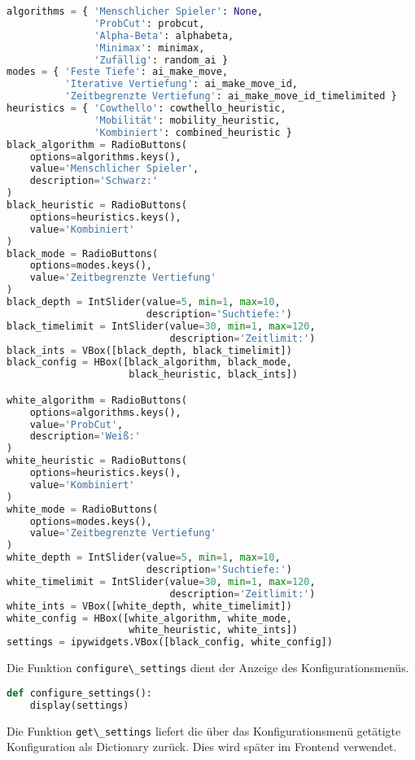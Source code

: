 \begin{lstlisting}[language=Python]
algorithms = { 'Menschlicher Spieler': None,
               'ProbCut': probcut,
               'Alpha-Beta': alphabeta,
               'Minimax': minimax,
               'Zufällig': random_ai }
modes = { 'Feste Tiefe': ai_make_move,
          'Iterative Vertiefung': ai_make_move_id,
          'Zeitbegrenzte Vertiefung': ai_make_move_id_timelimited }
heuristics = { 'Cowthello': cowthello_heuristic,
               'Mobilität': mobility_heuristic,
               'Kombiniert': combined_heuristic }
black_algorithm = RadioButtons(
    options=algorithms.keys(),
    value='Menschlicher Spieler',
    description='Schwarz:'
)
black_heuristic = RadioButtons(
    options=heuristics.keys(),
    value='Kombiniert'
)
black_mode = RadioButtons(
    options=modes.keys(),
    value='Zeitbegrenzte Vertiefung'
)
black_depth = IntSlider(value=5, min=1, max=10,
                        description='Suchtiefe:')
black_timelimit = IntSlider(value=30, min=1, max=120,
                            description='Zeitlimit:')
black_ints = VBox([black_depth, black_timelimit])
black_config = HBox([black_algorithm, black_mode,
                     black_heuristic, black_ints])

white_algorithm = RadioButtons(
    options=algorithms.keys(),
    value='ProbCut',
    description='Weiß:'
)
white_heuristic = RadioButtons(
    options=heuristics.keys(),
    value='Kombiniert'
)
white_mode = RadioButtons(
    options=modes.keys(),
    value='Zeitbegrenzte Vertiefung'
)
white_depth = IntSlider(value=5, min=1, max=10,
                        description='Suchtiefe:')
white_timelimit = IntSlider(value=30, min=1, max=120,
                            description='Zeitlimit:')
white_ints = VBox([white_depth, white_timelimit])
white_config = HBox([white_algorithm, white_mode,
                     white_heuristic, white_ints])
settings = ipywidgets.VBox([black_config, white_config])
\end{lstlisting}

Die Funktion \passthrough{\lstinline!configure\_settings!} dient der
Anzeige des Konfigurationsmenüs.

\begin{lstlisting}[language=Python]
def configure_settings():
    display(settings)
\end{lstlisting}

Die Funktion \passthrough{\lstinline!get\_settings!} liefert die über
das Konfigurationsmenü getätigte Konfiguration als Dictionary zurück.
Dies wird später im Frontend verwendet.

